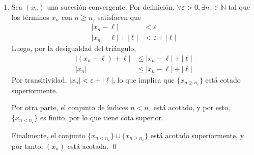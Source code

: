 \documentclass[11pt]{article}
\newcommand{\N}{\mathbb{N}}
\let\epsilon\varepsilon
\begin{document}
\begin{enumerate}[label=\alph*)]
%
    \item Sea $(x_n)$ una sucesión convergente. Por definición, $\forall \epsilon>0, \exists n_\varepsilon \in \N$ tal que los términos $x_n$ con $n\geq n_\varepsilon$ satisfacen que \begin{align*}
        |x_n - \ell| &< \epsilon \\
        |x_n - \ell| + |\ell| &< \epsilon + |\ell|
    \end{align*}
    Luego, por la desigualdad del triángulo, \begin{align*}
        \big|(x_n-\ell)+\ell\big| &\leq |x_n-\ell| + |\ell|\\
        |x_n| &\leq |x_n-\ell| + |\ell|
    \end{align*}
    Por transitividad, $|x_n|< \epsilon + |\ell|$, lo que implica que $\{x_{n\geq n_\varepsilon}\}$ está cotado superiormente.
    
    Por otra parte, el conjunto de índices $n<n_\varepsilon$ está acotado, y por esto, $\{x_{n<n_\varepsilon}\}$ es finito, por lo que tiene cota superior. %
    
    Finalmente, el conjunto $\{x_{n<n_\varepsilon}\} \cup \{x_{n\geq n_\varepsilon}\}$ está acotado superiormente, y por tanto, $(x_n)$ está acotada. \qed
\end{enumerate}
\end{document}
